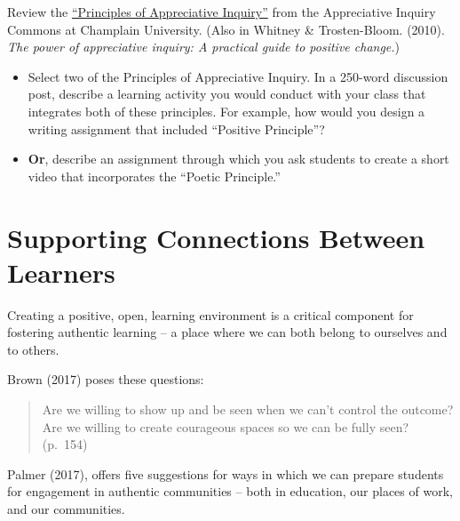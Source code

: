 \documentclass[
]{book}
\providecommand{\tightlist}{%
  \setlength{\itemsep}{0pt}\setlength{\parskip}{0pt}}
\begin{document}
\begin{reflect}
Review the \href{https://appreciativeinquiry.champlain.edu/learn/appreciative-inquiry-introduction/5-classic-principles-ai/}{``Principles of Appreciative Inquiry''} from the Appreciative Inquiry Commons at Champlain University. (Also in Whitney \& Trosten-Bloom. (2010). \emph{The power of appreciative inquiry: A practical guide to positive change.})

\begin{itemize}
\tightlist
\item
  Select two of the Principles of Appreciative Inquiry. In a 250-word discussion post, describe a learning activity you would conduct with your class that integrates both of these principles. For example, how would you design a writing assignment that included ``Positive Principle''?\\
\item
  \textbf{Or}, describe an assignment through which you ask students to create a short video that incorporates the ``Poetic Principle.''
\end{itemize}
\end{reflect}

\hypertarget{supporting-connections-between-learners}{%
\section{Supporting Connections Between Learners}\label{supporting-connections-between-learners}}

Creating a positive, open, learning environment is a critical component for fostering authentic learning -- a place where we can both belong to ourselves and to others.

Brown (2017) poses these questions:

\begin{quote}
Are we willing to show up and be seen when we can't control the outcome? Are we willing to create courageous spaces so we can be fully seen? (p.~154)
\end{quote}

Palmer (2017), offers five suggestions for ways in which we can prepare students for engagement in authentic communities -- both in education, our places of work, and our communities.
\end{document}
